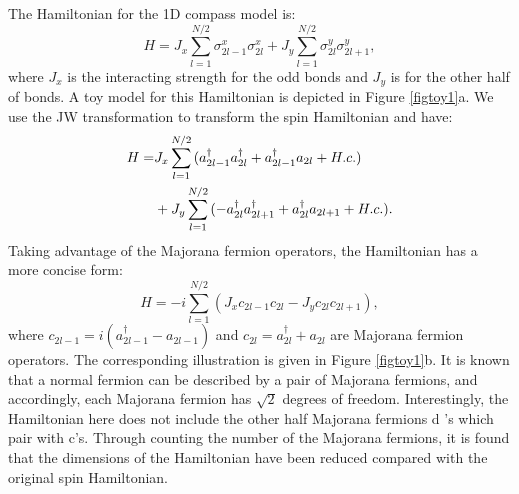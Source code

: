 \documentclass[twocolumn,floats,superscriptaddress]{revtex4}
\begin{document}
The Hamiltonian for the 1D compass model is:
\begin{equation}\label{A1dhamito}
H=J_x\sum_{l=1}^{N/2}{\sigma^x_{2l-1}\sigma^x_{2l}}+J_y\sum_{l=1}^{N/2}{\sigma^y_{2l}\sigma^y_{2l+1}},
\end{equation}
where $J_x$ is the interacting strength {for the odd bonds and $J_y$ is for the other half {of} bonds}.
A toy model for this Hamiltonian is depicted in Figure \ref{figtoy1}a. We use the JW transformation to transform the spin Hamiltonian and have:
%
\begin{align}\label{nfermion}
H=&J_x\sum_{l=1}^{N/2}{(a_{2l-1}^{\dag}a_{2l}^\dag+a_{2l-1}^{\dag}a_{2l}+H.c.)}\notag
\\
&+J_y\sum_{l=1}^{N/2}{(-a_{2l}^{\dag}a_{2l+1}^\dag+a_{2l}^{\dag}a_{2l+1}+H.c.)}. %
\end{align}
Taking advantage of the Majorana fermion operators, the Hamiltonian has a more concise form:
\begin{equation}\label{Amfermion}
H=-i\sum_{l=1}^{N/2}{(J_x c_{2l-1}c_{2l}-J_yc_{2l}c_{2l+1})}, %
\end{equation}
where $c_{2l-1}=i(a^\dag_{2l-1}-a_{2l-1})$ and $c_{2l}=a^\dag_{2l}+a_{2l}$ are Majorana fermion operators. The corresponding illustration is given in Figure \ref{figtoy1}b. It is known that a normal fermion can be described by a pair of Majorana fermions, and accordingly, each Majorana fermion has $\sqrt2$ degrees of freedom. Interestingly, the Hamiltonian here does not include the other half Majorana fermions d%
's which pair with c's. {Through counting the number of the Majorana fermions, it is found that the dimensions of the Hamiltonian have been reduced compared with the original spin Hamiltonian.}
\end{document}
